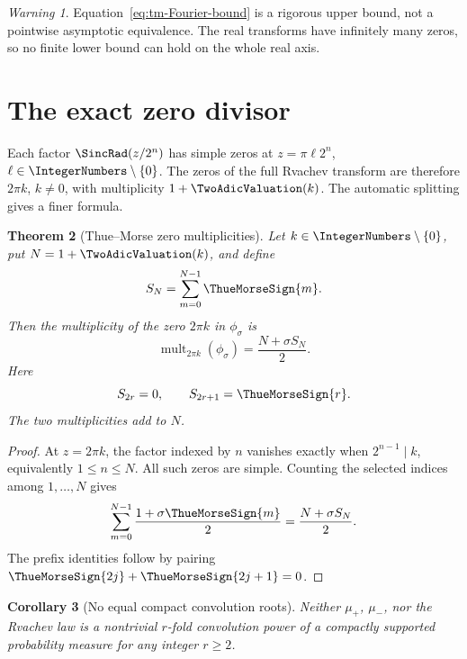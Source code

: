 \documentclass[11pt,oneside]{article}
\numberwithin{equation}{section}
\newtheorem{theorem}{Theorem}[section]
\newtheorem{corollary}[theorem]{Corollary}
\theoremstyle{definition}
\theoremstyle{remark}
\newtheorem{warning}[theorem]{Warning}
\begin{document}
\begin{warning}
Equation~\eqref{eq:tm-Fourier-bound} is a rigorous upper bound, not a pointwise asymptotic
equivalence.  The real transforms have infinitely many zeros, so no finite lower bound can
hold on the whole real axis.
\end{warning}

\section{The exact zero divisor}
\label{sec:zeros}

Each factor $\SincRad(z/2^n)$ has simple zeros at $z=\pi\ell2^n$, $\ell\in\IntegerNumbers\setminus\{0\}$.
The zeros of the full Rvachev transform are therefore $2\pi k$, $k\ne0$, with multiplicity
$1+\TwoAdicValuation(k)$.  The automatic splitting gives a finer formula.

\begin{theorem}[Thue--Morse zero multiplicities]
\label{thm:zero-multiplicity}
Let $k\in\IntegerNumbers\setminus\{0\}$, put $N=1+\TwoAdicValuation(k)$, and define
\begin{equation}
 S_N=\sum_{m=0}^{N-1}\ThueMorseSign{m}.
 \label{eq:SN}
\end{equation}
Then the multiplicity of the zero $2\pi k$ in $\phi_\sigma$ is
\begin{equation}
 \boxed{\quad
 \operatorname{mult}_{2\pi k}(\phi_\sigma)
 =\frac{N+\sigma S_N}{2}.
 \quad}
 \label{eq:zero-multiplicity}
\end{equation}
Here
\begin{equation}
 S_{2r}=0,
 \qquad
 S_{2r+1}=\ThueMorseSign{r}.
 \label{eq:prefix-exact}
\end{equation}
The two multiplicities add to $N$.
\end{theorem}

\begin{proof}
At $z=2\pi k$, the factor indexed by $n$ vanishes exactly when
$2^{n-1}\mid k$, equivalently $1\le n\le N$.  All such zeros are simple.  Counting the
selected indices among $1,\ldots,N$ gives
\[
 \sum_{m=0}^{N-1}\frac{1+\sigma\ThueMorseSign{m}}{2}
 =\frac{N+\sigma S_N}{2}.
\]
The prefix identities follow by pairing $\ThueMorseSign{2j}+\ThueMorseSign{2j+1}=0$.
\end{proof}

\begin{corollary}[No equal compact convolution roots]
\label{cor:no-roots}
Neither $\mu_+$, $\mu_-$, nor the Rvachev law is a nontrivial $r$-fold convolution power
of a compactly supported probability measure for any integer $r\ge2$.
\end{corollary}
\end{document}
